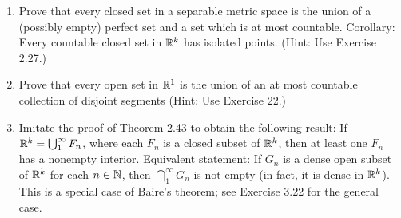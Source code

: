 \documentclass[../psets.tex]{subfiles}
\begin{document}
\begin{enumerate}[label={\textbf{\arabic*.}}]
    \item Prove that every closed set in a separable metric space is the union of a (possibly empty) perfect set and a set which is at most countable. Corollary: Every countable closed set in $\mathbb{R}^k$ has isolated points. (Hint: Use Exercise 2.27.)
    \item Prove that every open set in $\mathbb{R}^1$ is the union of an at most countable collection of disjoint segments (Hint: Use Exercise 22.)
    \item Imitate the proof of Theorem 2.43 to obtain the following result: If $\mathbb{R}^k=\bigcup_1^\infty F_n$, where each $F_n$ is a closed subset of $\mathbb{R}^k$, then at least one $F_n$ has a nonempty interior. Equivalent statement: If $G_n$ is a dense open subset of $\mathbb{R}^k$ for each $n\in\mathbb{N}$, then $\bigcap_1^\infty G_n$ is not empty (in fact, it is dense in $\mathbb{R}^k$). This is a special case of Baire's theorem; see Exercise 3.22 for the general case.
\end{enumerate}
\end{document}
